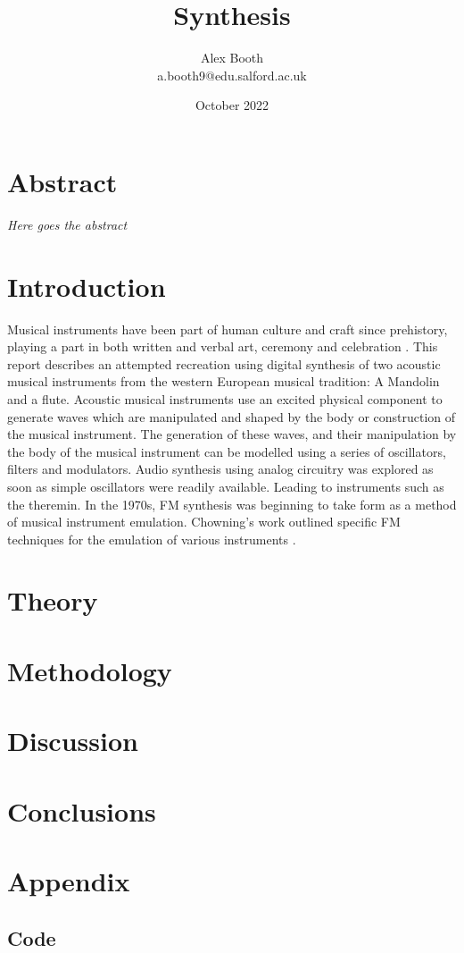 \documentclass{article}
\title{Synthesis}
\author{Alex Booth\\ a.booth9@edu.salford.ac.uk}
\date{October 2022}
\begin{document}
\maketitle
\section{Abstract}
    \textit{Here goes the abstract}
\section{Introduction}
Musical instruments have been part of human culture and craft since prehistory, playing a part in both written and verbal art, ceremony and celebration \cite{rault}.
This report describes an attempted recreation using digital synthesis of two acoustic musical instruments from the western European musical tradition: A Mandolin and a flute.
Acoustic musical instruments use an excited physical component to generate waves which are manipulated and shaped by the body or construction of the musical instrument. %
The generation of these waves, and their manipulation by the body of the musical instrument can be modelled using a series of oscillators, filters and modulators.
Audio synthesis using analog circuitry was explored as soon as simple oscillators were readily available. Leading to instruments such as the theremin.  %
In the 1970s, FM synthesis was beginning to take form as a method of musical instrument emulation. Chowning's work outlined specific FM techniques for the emulation of various instruments \cite{chowning1973synthesis}.


\section{Theory}
\section{Methodology}
\section{Discussion}
\section{Conclusions}
\section{Appendix}
\subsection{Code}




\end{document}
